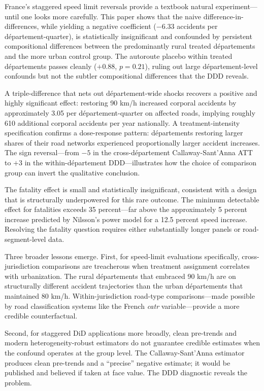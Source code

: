 \documentclass[12pt]{article}
\begin{document}
France's staggered speed limit reversals provide a textbook natural experiment---until one looks more carefully. This paper shows that the naive difference-in-differences, while yielding a negative coefficient ($-6.33$ accidents per d\'{e}partement-quarter), is statistically insignificant and confounded by persistent compositional differences between the predominantly rural treated d\'{e}partements and the more urban control group. The autoroute placebo within treated d\'{e}partements passes cleanly ($+0.88$, $p = 0.21$), ruling out large d\'{e}partement-level confounds but not the subtler compositional differences that the DDD reveals.

A triple-difference that nets out d\'{e}partement-wide shocks recovers a positive and highly significant effect: restoring 90 km/h increased corporal accidents by approximately 3.05 per d\'{e}partement-quarter on affected roads, implying roughly 610 additional corporal accidents per year nationally. A treatment-intensity specification confirms a dose-response pattern: d\'{e}partements restoring larger shares of their road networks experienced proportionally larger accident increases. The sign reversal---from $-5$ in the cross-d\'{e}partement Callaway-Sant'Anna ATT to $+3$ in the within-d\'{e}partement DDD---illustrates how the choice of comparison group can invert the qualitative conclusion.

The fatality effect is small and statistically insignificant, consistent with a design that is structurally underpowered for this rare outcome. The minimum detectable effect for fatalities exceeds 35 percent---far above the approximately 5 percent increase predicted by Nilsson's power model for a 12.5 percent speed increase. Resolving the fatality question requires either substantially longer panels or road-segment-level data.

Three broader lessons emerge. First, for speed-limit evaluations specifically, cross-jurisdiction comparisons are treacherous when treatment assignment correlates with urbanization. The rural d\'{e}partements that embraced 90 km/h are on structurally different accident trajectories than the urban d\'{e}partements that maintained 80 km/h. Within-jurisdiction road-type comparisons---made possible by road classification systems like the French \textit{catr} variable---provide a more credible counterfactual.

Second, for staggered DiD applications more broadly, clean pre-trends and modern heterogeneity-robust estimators do not guarantee credible estimates when the confound operates at the group level. The Callaway-Sant'Anna estimator produces clean pre-trends and a ``precise'' negative estimate; it would be published and believed if taken at face value. The DDD diagnostic reveals the problem.
\end{document}
